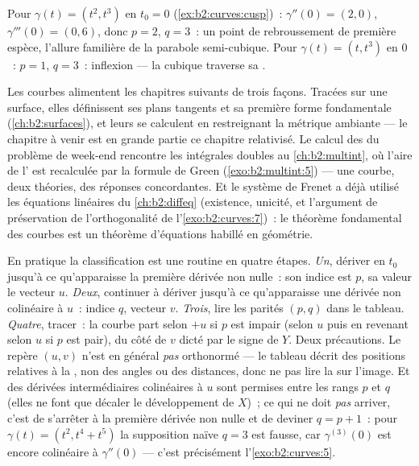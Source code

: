 \begin{example}
Pour $\gamma(t) = (t^2, t^3)$ en $t_0 = 0$
(\cref{ex:b2:curves:cusp})~: $\gamma'' (0)= (2, 0)$, $\gamma'''(0) =
(0, 6)$, donc $p = 2$, $q = 3$~: un point de rebroussement de
première espèce, l'allure familière de la parabole semi-cubique.
Pour $\gamma(t) = (t,
t^3)$ en $0$~: $p = 1$, $q = 3$~: inflexion --- la cubique traverse
sa .
\end{example}

\begin{remark}
Les courbes alimentent les chapitres suivants de trois façons.
Tracées sur une
surface, elles définissent ses plans tangents et sa première
forme fondamentale (\cref{ch:b2:surfaces}), et leurs 
se calculent en restreignant la métrique ambiante --- le
chapitre à venir est en grande partie ce chapitre relativisé. Le
calcul des  du problème de week-end rencontre les
intégrales doubles au \cref{ch:b2:multint}, où l'aire de
l' est recalculée par la formule de Green
(\cref{exo:b2:multint:5}) --- une courbe, deux théories, des
réponses concordantes. Et le système de Frenet a déjà utilisé les
équations  linéaires du \cref{ch:b2:diffeq}
(existence, unicité, et l'argument de préservation de
l'orthogonalité de l'\cref{exo:b2:curves:7})~: le théorème
fondamental des courbes est un théorème d'équations
 habillé en géométrie.
\end{remark}

\begin{remark}
En pratique la classification est une routine en quatre étapes.
\emph{Un}, dériver en $t_0$ jusqu'à ce qu'apparaisse la première
dérivée non nulle~: son indice est $p$, sa valeur le vecteur
$u$. \emph{Deux}, continuer à dériver jusqu'à ce qu'apparaisse une
dérivée non colinéaire à $u$~: indice $q$, vecteur $v$.
\emph{Trois}, lire les parités $(p, q)$ dans le tableau.
\emph{Quatre}, tracer~: la courbe part selon $+u$ si $p$ est impair
(selon $u$ puis en revenant selon $u$ si $p$ est pair), du côté
de $v$ dicté par le signe de $Y$. Deux précautions. Le repère
$(u, v)$ n'est en général \emph{pas} orthonormé --- le tableau
décrit des positions relatives à la , non des angles
ou des distances, donc ne pas lire la  sur l'image.
Et des dérivées intermédiaires colinéaires à $u$ sont permises
entre les rangs $p$ et $q$ (elles ne font que décaler le
développement de $X$)~; ce qui ne doit \emph{pas} arriver, c'est de
s'arrêter à la première dérivée non nulle et de deviner $q = p + 1$~:
pour $\gamma(t) = (t^2, t^4 + t^5)$ la supposition naïve $q = 3$
est fausse, car $\gamma^{(3)}(0)$ est encore colinéaire à
$\gamma''(0)$ --- c'est précisément l'\cref{exo:b2:curves:5}.
\end{remark}

